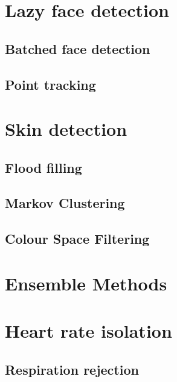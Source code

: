 \section{Lazy face detection}
\subsection{Batched face detection}
\subsection{Point tracking}


\section{Skin detection}
\subsection{Flood filling}
\subsection{Markov Clustering}
\subsection{Colour Space Filtering}

\section{Ensemble Methods}

\section{Heart rate isolation}
\subsection{Respiration rejection}